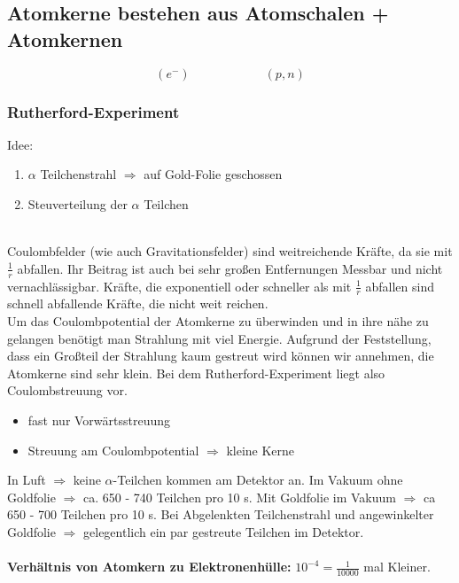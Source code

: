\subsection{Atomkerne bestehen aus Atomschalen + Atomkernen}

\begin{equation*}
(e^-) \qquad \qquad \qquad (p,n)
\end{equation*}

\subsubsection{Rutherford-Experiment}

Idee:
\begin{enumerate}[1)]
	\item $ \alpha $ Teilchenstrahl $ \Rightarrow $ auf Gold-Folie geschossen
	\item Steuverteilung der $ \alpha $ Teilchen
\end{enumerate}
\\
Coulombfelder (wie auch Gravitationsfelder) sind weitreichende Kräfte, da sie mit $ \frac{1}{r} $ abfallen. Ihr Beitrag ist auch bei sehr großen Entfernungen Messbar und nicht vernachlässigbar. Kräfte, die exponentiell oder schneller als mit $ \frac{1}{r} $ abfallen sind schnell abfallende Kräfte, die nicht weit reichen.\\
Um das Coulombpotential der Atomkerne zu überwinden und in ihre nähe zu gelangen benötigt man Strahlung mit viel Energie. Aufgrund der Feststellung, dass ein Großteil der Strahlung kaum gestreut wird können wir annehmen, die Atomkerne sind sehr klein. Bei dem Rutherford-Experiment liegt also Coulombstreuung vor.
\begin{itemize}
	\item fast nur Vorwärtsstreuung
	\item Streuung am Coulombpotential $ \Rightarrow $ kleine Kerne
\end{itemize}
In Luft $ \Rightarrow $ keine $ \alpha $-Teilchen kommen am Detektor an. Im Vakuum ohne Goldfolie $ \Rightarrow $ ca. 650 - 740 Teilchen pro 10 s. Mit Goldfolie im Vakuum $ \Rightarrow $ ca 650 - 700 Teilchen pro 10 s. Bei Abgelenkten Teilchenstrahl und angewinkelter Goldfolie $ \Rightarrow $ gelegentlich ein par gestreute Teilchen im Detektor.\\
\\
\textbf{Verhältnis von Atomkern zu Elektronenhülle:} $ 10^{-4} = \frac{1}{10000} $ mal Kleiner.

